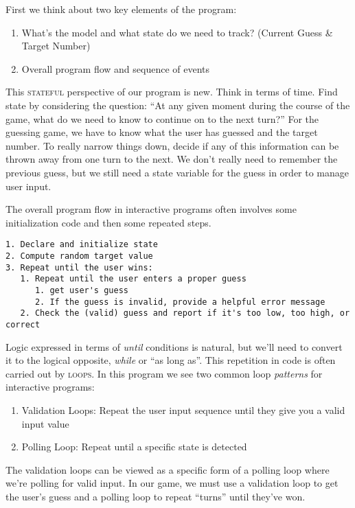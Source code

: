\documentclass[]{tufte-handout}
\begin{document}
First we think about two key elements of the program: 
\begin{enumerate}
\item What's the model and what state do we need to track? (Current Guess \& Target Number)
\item Overall program flow and sequence of events
\end{enumerate}
This \textsc{stateful} perspective of our program is new.  Think in terms of time. Find state by considering the question: ``At any given moment during the course of the game, what do we need to know to continue on to the next turn?''  For the guessing game, we have to know what the user has guessed and the target number.  To really narrow things down, decide if any of this information can be thrown away from one turn to the next. We don't really need to remember the previous guess, but we still need a state variable for the guess in order to manage user input. 

The overall program flow in interactive programs often involves some initialization code and then some repeated steps.
\begin{verbatim}
1. Declare and initialize state
2. Compute random target value
3. Repeat until the user wins:
   1. Repeat until the user enters a proper guess
      1. get user's guess
      2. If the guess is invalid, provide a helpful error message
   2. Check the (valid) guess and report if it's too low, too high, or correct 
\end{verbatim}
Logic expressed in terms of \textit{until} conditions is natural, but we'll need to convert it to the logical opposite, \textit{while} or ``as long as''. This repetition in code is often carried out by \textsc{loops}.  In this program we see two common loop \textit{patterns} for interactive programs:
\begin{enumerate}
\item Validation Loops: Repeat the user input sequence until they give you a valid input value
\item Polling Loop:  Repeat until a specific state is detected
\end{enumerate}  
The validation loops can be viewed as a specific form of a polling loop where we're polling for valid input.  In our game, we must use a validation loop to get the user's guess and a polling loop to repeat ``turns'' until they've won.
\end{document}
